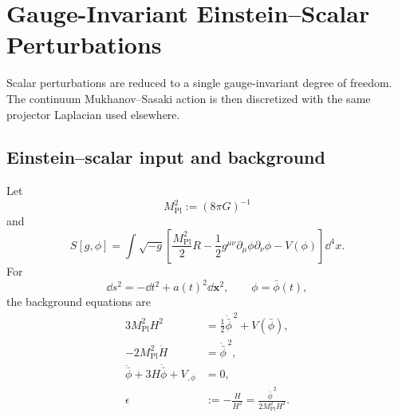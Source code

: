 \chapter{Gauge-Invariant Einstein--Scalar Perturbations}

Scalar perturbations are reduced to a single gauge-invariant degree of freedom.  The continuum Mukhanov--Sasaki action is then discretized with the same projector Laplacian used elsewhere.

\allowdisplaybreaks

\section{Einstein--scalar input and background}
Let
\begin{equation}
M_{\mathrm{Pl}}^2:=(8\pi G)^{-1}
\end{equation}
and
\begin{equation}
S[g,\phi]
=\int\sqrt{-g}
\left[
\frac{M_{\mathrm{Pl}}^2}{2}R
-\frac12g^{\mu\nu}\partial_\mu\phi\partial_\nu\phi
-V(\phi)
\right]\dd^4x.
\end{equation}
For
\begin{equation}
\dd s^2=-\dd t^2+a(t)^2\dd\bm x^2,
\qquad
\phi=\bar\phi(t),
\end{equation}
the background equations are
\begin{align}
3M_{\mathrm{Pl}}^2H^2
&=\frac12\dot{\bar\phi}^{\,2}+V(\bar\phi),\\
-2M_{\mathrm{Pl}}^2\dot H
&=\dot{\bar\phi}^{\,2},\\
\ddot{\bar\phi}+3H\dot{\bar\phi}+V_{,\phi}
&=0,\\
\epsilon
&:=-\frac{\dot H}{H^2}
=\frac{\dot{\bar\phi}^{\,2}}
{2M_{\mathrm{Pl}}^2H^2}.
\end{align}

